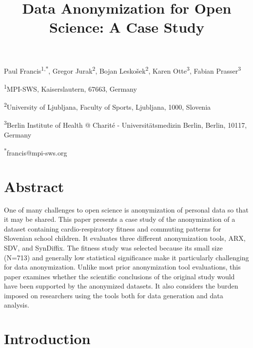 \documentclass[10pt]{article}
\title{Data Anonymization for Open Science: A Case Study}
\date{} %
\begin{document}
\flushbottom
\maketitle
\thispagestyle{empty}

Paul Francis\textsuperscript{1,*}, Gregor Jurak\textsuperscript{2}, Bojan Leskošek\textsuperscript{2}, Karen Otte\textsuperscript{3}, Fabian Prasser\textsuperscript{3}

\textsuperscript{1}{MPI-SWS, Kaiserslautern, 67663, Germany}

\textsuperscript{2}{University of Ljubljana, Faculty of Sports, Ljubljana, 1000, Slovenia}

\textsuperscript{3}{Berlin Institute of Health @ Charité - Universitätsmedizin Berlin, Berlin, 10117, Germany}

\textsuperscript{*}{francis@mpi-sws.org}

\section*{Abstract}
One of many challenges to open science is anonymization of personal data so that it may be shared. This paper presents a case study of the anonymization of a dataset containing cardio-respiratory fitness and commuting patterns for Slovenian school children. It evaluates three different anonymization tools, ARX, SDV, and SynDiffix. The fitness study was selected because its small size (N=713) and generally low statistical significance make it particularly challenging for data anonymization. Unlike most prior anonymization tool evaluations, this paper examines whether the scientific conclusions of the original study would have been supported by the anonymized datasets. It also considers the burden imposed on researchers using the tools both for data generation and data analysis.

\section*{Introduction}
\label{sec:introduction}
\end{document}
